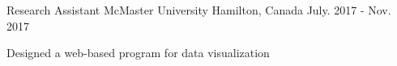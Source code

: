 \begin{cventries}
  \cventry
{Research Assistant} %
{McMaster University} %
{Hamilton, Canada} %
{July. 2017 - Nov. 2017} %
{\begin{cvitems}
		\item
		{Designed a web-based program for data visualization}
	\end{cvitems}
}




\end{cventries}

